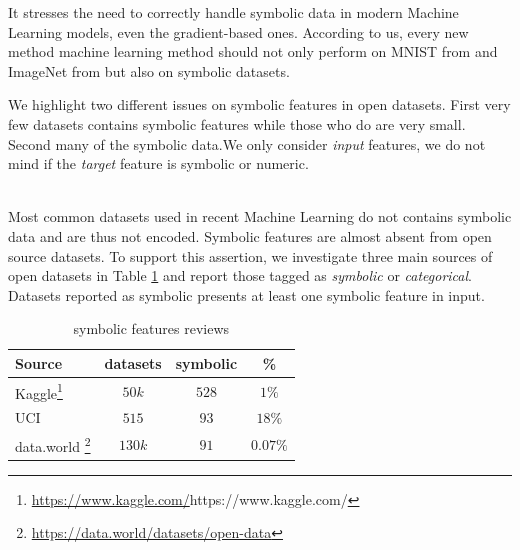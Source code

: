 It stresses the need to correctly handle symbolic data in modern Machine Learning models, even the gradient-based ones. According to us, every new method machine learning method should not only perform on MNIST from \cite{MNIST} and ImageNet from \cite{IMAGENET} but also on symbolic datasets.

\newline

We highlight two different issues on symbolic features in open datasets. First very few datasets contains symbolic features while those who do are very small. Second many of the symbolic data.We only consider \textit{input} features, we do not mind if the \textit{target} feature is symbolic or numeric.

\\


Most common datasets used in recent Machine Learning do not contains symbolic data and are thus not encoded. Symbolic features are almost absent from open source datasets. To support this assertion, we investigate three main sources of open datasets in Table \ref{tab:review} and report those tagged as \textit{symbolic} or \textit{categorical}. Datasets reported as symbolic presents at least one symbolic feature in input.




\begin{table}[h!]
  \caption{symbolic features reviews}
  \label{tab:catFeatReview}
  \begin{footnotesize}
  \begin{center}
  \begin{tabular}{lccc}
    \toprule
    Source & datasets & symbolic  & \%  \\
    \midrule
    Kaggle\footnote{\url{https://www.kaggle.com/}{https://www.kaggle.com/}} & $50k$  & $528$ & $1\%$   \\
    UCI \cite{UCI}                                                          & $515$  & $93$  & $18\%$  \\
    data.world \footnote{\url{https://data.world/datasets/open-data}}                         & $130k$ & $91$  & $0.07\%$       
\end{tabular}
\end{center}
\end{footnotesize}
\label{tab:review}
\end{table}


